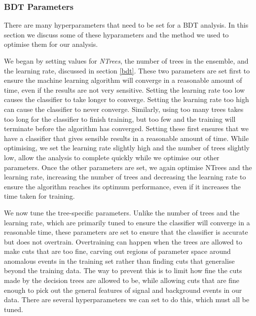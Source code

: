 \documentclass[11pt]{cuthesis}
\begin{document}
\subsubsection{BDT Parameters}
There are many hyperparameters that need to be set for a BDT analysis. In this section we discuss some of these hyparameters and the method we used to optimise them for our analysis. 

We began by setting values for \textit{NTrees}, the number of trees in the ensemble, and the learning rate, discussed in section \ref{bdt}. These two parameters are set first to ensure the machine learning algorithm will converge in a reasonable amount of time, even if the results are not very sensitive. Setting the learning rate too low causes the classifier to take longer to converge. Setting the learning rate too high can cause the classifier to never converge. Similarly, using too many trees takes too long for the classifier to finish training, but too few and the training will terminate before the algorithm has converged. Setting these first ensures that we have a classifier that gives sensible results in a reasonable amount of time. While optimising, we set the learning rate slightly high and the number of trees slightly low, allow the analysis to complete quickly while we optimise our other parameters. Once the other parameters are set, we again optimise NTrees and the learning rate, increasing the number of trees and decreasing the learning rate to ensure the algorithm reaches its optimum performance, even if it increases the time taken for training.

We now tune the tree-specific parameters. Unlike the number of trees and the learning rate, which are primarily tuned to ensure the classifier will converge in a reasonable time, these parameters are set to ensure that the classifier is accurate but does not overtrain. Overtraining can happen when the trees are allowed to make cuts that are too fine, carving out regions of parameter space around anomalous events in the training set rather than finding cuts that generalise beyond the training data. The way to prevent this is to limit how fine the cuts made by the decision trees are allowed to be, while allowing cuts that are fine enough to pick out the general features of signal and background events in our data. There are several hyperparameters we can set to do this, which must all be tuned. 
\end{document}
